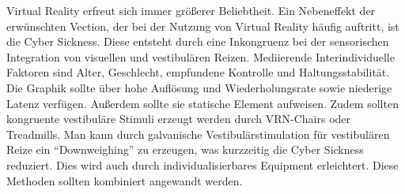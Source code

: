 Virtual Reality erfreut sich immer gr\"o{\ss}erer Beliebtheit. Ein  Nebeneffekt der erw\"unschten Vection, der bei der Nutzung von Virtual Reality h\"aufig auftritt, ist die Cyber Sickness.
Diese entsteht durch eine Inkongruenz bei der sensorischen Integration von visuellen und vestibul\"aren Reizen.
Mediierende Interindividuelle Faktoren sind Alter, Geschlecht, empfundene Kontrolle und Haltungsstabilit\"at.
Die Graphik sollte \"uber hohe Aufl\"osung und Wiederholungsrate sowie niederige Latenz verf\"ugen. Au{\ss}erdem sollte sie statische Element aufweisen. Zudem sollten kongruente vestibul\"are Stimuli erzeugt werden durch VRN-Chairs oder Treadmills. Man kann durch galvanische Vestibul\"arstimulation f\"ur vestibul\"aren Reize ein "`Downweighing"' zu erzeugen, was kurzzeitig die Cyber Sickness reduziert. Dies wird auch durch individualisierbares Equipment erleichtert. Diese Methoden sollten kombiniert angewandt werden.




